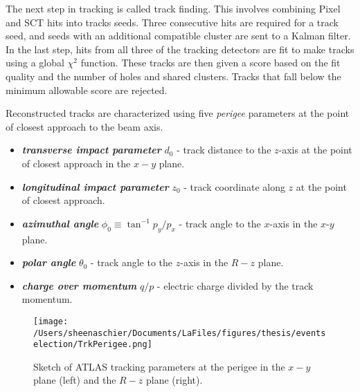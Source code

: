 The next step in tracking is called track finding.  This involves combining Pixel and SCT hits into tracks seeds.  Three consecutive hits are required for a track seed, and seeds with an additional compatible cluster are sent to a Kalman filter.  In the last step, hits from all three of the tracking detectors are fit to make tracks using a global $\chi^2$ function.  These tracks are then given a score based on the fit quality and the number of holes and shared clusters.  Tracks that fall below the minimum allowable score are rejected.


Reconstructed tracks are characterized using five \textit{perigee} parameters at the point of closest approach to the beam axis.  
\begin{itemize}
\item \textbf{\textit{transverse impact parameter}} $d_0$ - track distance to the $z$-axis at the point of closest approach in the $x-y$ plane.
\item \textbf{\textit{longitudinal impact parameter}} $z_0$ - track coordinate along $z$ at the point of closest approach.
\item \textbf{\textit{azimuthal angle}} $\phi_0\equiv\tan^{-1} p_y/p_x$ - track angle to the $x$-axis in the $x$-$y$ plane.
\item \textbf{\textit{polar angle}} $\theta_0$ - track angle to the $z$-axis in the $R-z$ plane.
\item \textbf{\textit{charge over momentum}} $q/p$ - electric charge divided by the track momentum.
\end{itemize}
  \begin{figure}[tbp]
       \texttt{[image: /Users/sheenaschier/Documents/LaFiles/figures/thesis/eventselection/TrkPerigee.png]}\\
   \caption{Sketch of ATLAS tracking parameters at the perigee in the $x-y$ plane (left) and the $R-z$ plane (right). }
   \label{fig:trkParam}
 \end{figure}
 

